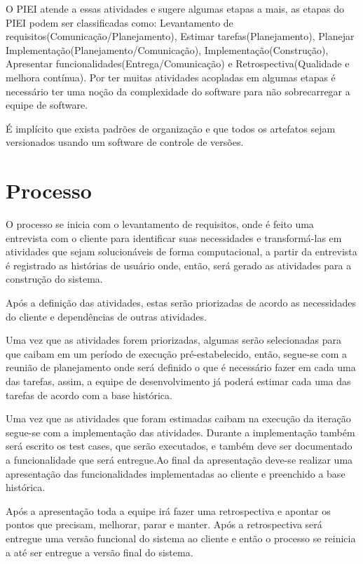 \documentclass[	DIV=calc,%
							paper=a4,%
							fontsize=12pt,%
							onecolumn]{scrartcl}	 					%
\begin{document}
O PIEI atende a essas atividades e sugere algumas etapas a mais, as etapas do PIEI podem ser classificadas como: Levantamento de requisitos(Comunicação/Planejamento), Estimar tarefas(Planejamento), Planejar Implementação(Planejamento/Comunicação), Implementação(Construção), Apresentar funcionalidades(Entrega/Comunicação) e Retrospectiva(Qualidade e melhora contínua). Por ter muitas atividades acopladas em algumas etapas é necessário ter uma noção da complexidade do  software para não sobrecarregar a equipe de software.

É implícito que exista padrões de organização e que todos os artefatos sejam versionados usando um software de controle de versões.

\section{Processo}
O processo se inicia com o levantamento de requisitos, onde é feito uma entrevista com o cliente para identificar suas necessidades e transformá-las em atividades que sejam solucionáveis de forma computacional, a partir da entrevista é registrado as histórias de usuário onde, então, será gerado as atividades para a construção do sistema. 

Após a definição das atividades, estas serão priorizadas de acordo as necessidades do cliente e dependências de outras atividades. 

Uma vez que as atividades forem priorizadas, algumas serão selecionadas para que caibam em um período de execução pré-estabelecido, então, segue-se com a reunião de planejamento onde será definido o que é necessário fazer em cada uma das tarefas, assim, a equipe de desenvolvimento já poderá estimar cada uma das tarefas de acordo com a base histórica.

Uma vez que as atividades que foram estimadas caibam na execução da iteração segue-se com a implementação das atividades. Durante a implementação também será escrito os test cases, que serão executados, e também deve ser documentado a funcionalidade que será entregue.Ao final da apresentação deve-se realizar uma apresentação das funcionalidades implementadas ao cliente e preenchido a base histórica. 

Após a apresentação toda a equipe irá fazer uma retrospectiva e apontar os pontos que precisam, melhorar, parar e manter. Após a retrospectiva será entregue uma versão funcional do sistema ao cliente e então o processo se reinicia a até ser entregue a versão final do sistema.
\end{document}
